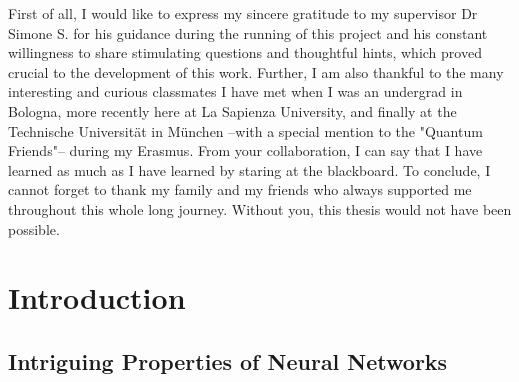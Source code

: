 \documentclass[LaM,binding=0.6cm]{./packages/sapthesis/sapthesis}
\begin{document}
\begin{acknowledgments}
    First of all, I would like to express my sincere gratitude to my supervisor Dr Simone S. for his guidance during the running of this project and his 
    constant willingness to share stimulating questions and thoughtful hints, which proved crucial to the development of this work.
    Further, I am also thankful to the many interesting and curious classmates I have met when I was an undergrad in Bologna, more recently here at La Sapienza University, and finally at the 
    Technische Universität in München --with a special mention to the "Quantum Friends"-- during my Erasmus. From your collaboration, I can say that I have learned as much as I have learned by staring at the 
    blackboard. To conclude, I cannot forget to thank my family and my friends who always supported me throughout this whole long journey. Without you, this thesis would not have been possible.

\end{acknowledgments}

\tableofcontents


\mainmatter

\chapter{Introduction}

    \section{Intriguing Properties of Neural Networks}
\end{document}
